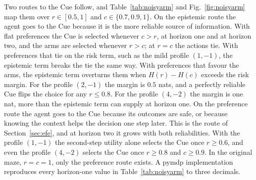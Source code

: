 \documentclass[pdflatex,sn-apa]{sn-jnl}%
\theoremstyle{definition}
\begin{document}
Two routes to the Cue follow, and Table~\ref{tab:noisyarm} and Fig.~\ref{fig:noisyarm} map them over $r \in [0.5, 1]$ and $c \in \{0.7, 0.9, 1\}$. On the epistemic route the agent goes to the Cue because it is the more reliable source of information. With flat preferences the Cue is selected whenever $c > r$, at horizon one and at horizon two, and the arms are selected whenever $r > c$; at $r = c$ the actions tie. With preferences that tie on the risk term, such as the mild profile $(1,-1)$, the epistemic term breaks the tie the same way. With preferences that favour the arms, the epistemic term overturns them when $H(r) - H(c)$ exceeds the risk margin. For the profile $(2,-1)$ the margin is $0.5$ nats, and a perfectly reliable Cue flips the choice for any $r \le 0.8$. For the profile $(4,-2)$ the margin is one nat, more than the epistemic term can supply at horizon one. On the preference route the agent goes to the Cue because its outcomes are safe, or because knowing the context helps the decision one step later. This is the route of Section~\ref{sec:efe}, and at horizon two it grows with both reliabilities. With the profile $(1,-1)$ the second-step utility alone selects the Cue once $r \ge 0.6$, and even the profile $(4,-2)$ selects the Cue once $r \ge 0.8$ and $c \ge 0.9$. In the original maze, $r = c = 1$, only the preference route exists. A pymdp implementation reproduces every horizon-one value in Table~\ref{tab:noisyarm} to three decimals.
\end{document}
